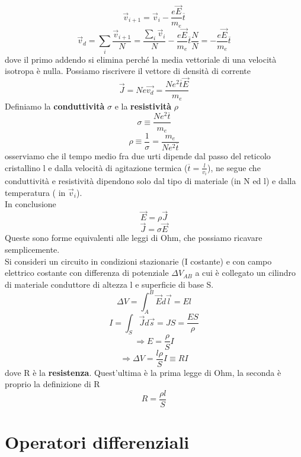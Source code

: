 \documentclass[10pt,a4paper]{article}
\begin{document}
\[\vec{v}_{i+1}  = \vec{v}_i - \frac{e\vec{E}}{m_e}\overline{t}\]
\[\vec{v}_d = \sum_i\frac{\vec{v}_{i+1}}{N}= \frac{\sum_i\vec{v}_i}{N} - \frac{e\vec{E}}{m_e}\overline{t} \frac{N}{N} = - \frac{e\vec{E}}{m_e}\overline{t}\]
dove il primo addendo si elimina perché la media vettoriale di una velocità isotropa è nulla. Possiamo riscrivere il vettore di densità di corrente
\[\vec{J}= Ne\vec{v_d}= \frac{Ne^2\overline{t}\vec{E}}{m_e}\]
Definiamo la \textbf{conduttività} $\sigma$ e la \textbf{resistività} $\rho$
\[\sigma \equiv \frac{Ne^2\overline{t}}{m_e}\]
\[\rho \equiv \frac{1}{\sigma}= \frac{m_e}{Ne^2\overline{t}}\]
osserviamo che il tempo medio fra due urti dipende dal passo del reticolo cristallino l e dalla velocità di agitazione termica (\(\overline{t}= \frac{l}{v_i}\)), ne segue che conduttività e resistività dipendono solo dal tipo di materiale (in N ed l) e dalla temperatura ( in $\vec{v}_i$). \\
In conclusione
\[\vec{E}= \rho \vec{J}\]
\[\vec{J}= \sigma \vec{E}\]
Queste sono forme equivalenti alle leggi di Ohm, che possiamo ricavare semplicemente.\\
Si consideri un circuito in condizioni stazionarie (I costante) e con campo elettrico costante con differenza di potenziale \(\Delta V_{AB}\) a cui è collegato un cilindro di materiale conduttore di altezza l e superficie di base S. 
\[\Delta V = \int_{A}^{B}\vec{E}d\vec{l}=El\]
\[I = \int_S \vec{J}d\vec{s}= JS= \frac{E S}{\rho}\]
\[\Rightarrow E = \frac{\rho}{S}I\]
\[\Rightarrow \Delta V = \frac{l\rho}{S}I \equiv R I\]
dove R è la \textbf{resistenza}. Quest'ultima è la prima legge di Ohm, la seconda è proprio la definizione di R
\[R = \frac{\rho l}{S}\]
\appendix
\section{Operatori differenziali}
\end{document}
